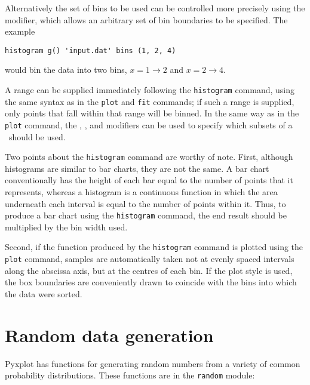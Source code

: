 Alternatively the set of bins to be used can be controlled more precisely using
the  modifier, which allows an arbitrary set of bin boundaries to
be specified. The example

\begin{verbatim}
histogram g() 'input.dat' bins (1, 2, 4)
\end{verbatim}

\noindent would bin the data into two bins, $x=1\to 2$ and $x=2\to 4$.

A range can be supplied immediately following the {\tt histogram} command,
using the same syntax as in the {\tt plot} and {\tt fit} commands; if such a
range is supplied, only points that fall within that range will be binned.  In
the same way as in the {\tt plot} command, the ,
,  and  modifiers can be used to
specify which subsets of a \datafile\ should be used.

Two points about the {\tt histogram} command are worthy of note. First,
although histograms are similar to bar charts, they are not the same.  A bar
chart conventionally has the height of each bar equal to the number of points
that it represents, whereas a histogram is a continuous function in which the
area underneath each interval is equal to the number of points within it.
Thus, to produce a bar chart using the {\tt histogram} command, the end result
should be multiplied by the bin width used.

Second, if the function produced by the {\tt histogram} command is plotted
using the {\tt plot} command, samples are automatically taken not at evenly
spaced intervals along the abscissa axis, but at the centres of each bin. If
the  plot style is used, the box boundaries are conveniently
drawn to coincide with the bins into which the data were sorted.

\section{Random data generation}

Pyxplot has functions for generating random numbers from a variety of common
probability distributions. These functions are in the {\tt random} module:

